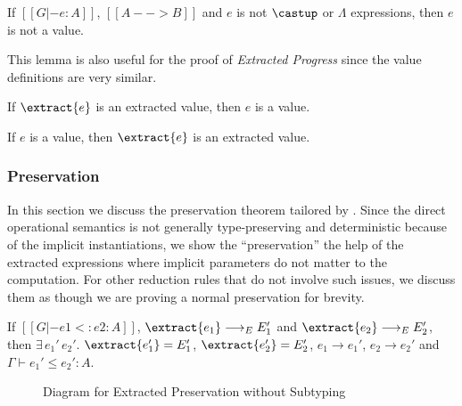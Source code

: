 \begin{lemma}
    If $[[G |- e : A]]$, $[[A --> B]]$ and $e$ is not $\castup$ or $\Lambda$ expressions,
    then $e$ is not a value.
\end{lemma}

This lemma is also useful for the proof of \emph{Extracted Progress} since the
value definitions are very similar.

\begin{lemma}
    If $\extract{e}$ is an extracted value, then $e$ is a value.
\end{lemma}

\begin{lemma}
    If $e$ is a value, then $\extract{e}$ is an extracted value.
\end{lemma}

\subsubsection{Preservation}

In this section we discuss the preservation theorem tailored by \name.
Since the direct operational semantics is not generally type-preserving and
deterministic because of the implicit instantiations, we show the
``preservation'' the help of the extracted expressions where implicit parameters
do not matter to the computation. For other reduction rules that do not involve
such issues, we discuss them as though we are proving a normal preservation
for brevity.

\begin{theorem}
    If $[[G |- e1 <: e2 : A]]$, $\extract{e_1} \longrightarrow_E E_1'$ and $\extract{e_2} \longrightarrow_E E_2'$,
    then $\exists\,e_1' \, e_2'.$ $\extract{e_1'} = E_1'$, $\extract{e_2'} = E_2'$, $e_1 \longrightarrow e_1'$, $e_2 \longrightarrow e_2'$ and $\Gamma \vdash e_1' \le e_2' : A$.
\end{theorem}

\begin{figure}
    \centering
    \caption{Diagram for Extracted Preservation without Subtyping}
    \label{fig:preservation}
\end{figure}

